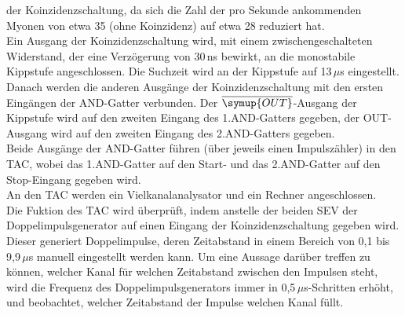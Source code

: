     der Koinzidenzschaltung, da sich die Zahl der pro Sekunde ankommenden
    Myonen von etwa 35 (ohne Koinzidenz) auf etwa 28 reduziert hat.\\
    Ein Ausgang der Koinzidenzschaltung wird, mit einem zwischengeschalteten
    Widerstand, der eine Verzögerung von 30\,ns bewirkt, an die monostabile
    Kippstufe angeschlossen. Die Suchzeit wird an der Kippstufe auf 13\,$\mu$s
    eingestellt.\\
    Danach werden die anderen Ausgänge der Koinzidenzschaltung
    mit den ersten Eingängen der AND-Gatter verbunden.
    Der $\overline{\symup{OUT}}$-Ausgang der Kippstufe wird auf den zweiten
    Eingang des 1.AND-Gatters gegeben, der OUT-Ausgang wird auf den zweiten
    Eingang des 2.AND-Gatters gegeben.\\
    Beide Ausgänge der AND-Gatter führen (über jeweils einen Impulszähler)
    in den TAC, wobei das 1.AND-Gatter auf den Start- und das 2.AND-Gatter
    auf den Stop-Eingang gegeben wird. \\
    An den TAC werden ein Vielkanalanalysator und ein Rechner angeschlossen.\\
    Die Fuktion des TAC wird überprüft, indem anstelle der beiden SEV
    der Doppelimpulsgenerator auf einen Eingang der Koinzidenzschaltung gegeben wird.
    Dieser generiert Doppelimpulse, deren Zeitabstand in einem Bereich
    von 0,1 bis 9,9\,$\mu$s manuell eingestellt werden kann.
    Um eine Aussage darüber treffen zu können, welcher Kanal für welchen
    Zeitabstand zwischen den Impulsen steht, wird die Frequenz des
    Doppelimpulsgenerators immer in 0,5\,$\mu$s-Schritten erhöht, und beobachtet,
    welcher Zeitabstand der Impulse welchen Kanal füllt.
